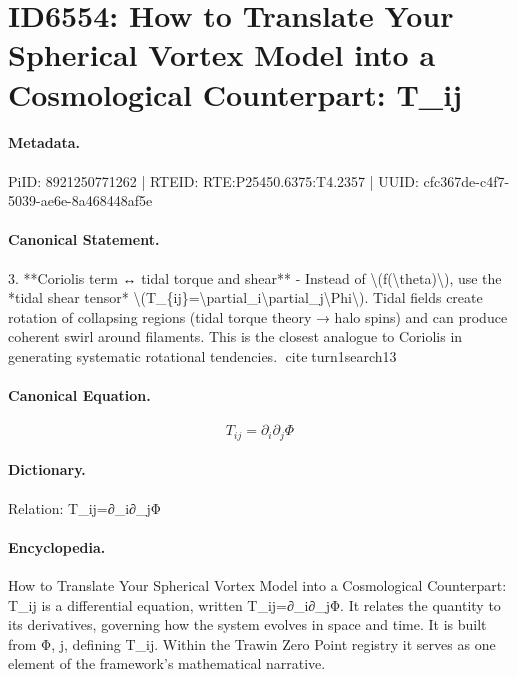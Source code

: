 \section*{ID6554: How to Translate Your Spherical Vortex Model into a Cosmological Counterpart: T\_ij}
\paragraph{Metadata.}
PiID: 8921250771262 | RTEID: RTE:P25450.6375:T4.2357 | UUID: cfc367de-c4f7-5039-ae6e-8a468448af5e

\paragraph{Canonical Statement.}
3. **Coriolis term ↔ tidal torque and shear** - Instead of \textbackslash{}(f(\textbackslash{}theta)\textbackslash{}), use the *tidal shear tensor* \textbackslash{}(T\_\{ij\}=\textbackslash{}partial\_i\textbackslash{}partial\_j\textbackslash{}Phi\textbackslash{}). Tidal fields create rotation of collapsing regions (tidal torque theory → halo spins) and can produce coherent swirl around filaments. This is the closest analogue to Coriolis in generating systematic rotational tendencies. citeturn1search13

\paragraph{Canonical Equation.}
\[
T_{ij}=\partial_i\partial_j\Phi
\]

\paragraph{Dictionary.}
Relation: T\_ij=∂\_i∂\_jΦ

\paragraph{Encyclopedia.}
How to Translate Your Spherical Vortex Model into a Cosmological Counterpart: T\_ij is a differential equation, written T\_ij=∂\_i∂\_jΦ. It relates the quantity to its derivatives, governing how the system evolves in space and time. It is built from Φ, j, defining T\_ij. Within the Trawin Zero Point registry it serves as one element of the framework's mathematical narrative.
